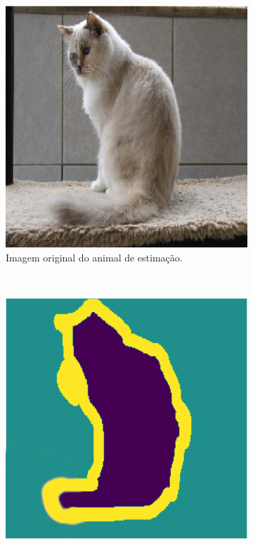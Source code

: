 \begin{figure}[H]
   \centering
   \caption[Amostra com máscara de características.]{Exemplo de amostra com máscara de características.}
   \label{project:fig:dataset:pets_1}
    \begin{subfigure}[t]{0.45\textwidth}
        \centering
        \includegraphics[width=1\linewidth]{recursos/imagens/project/pets_ori.png}
        \caption{Imagem original do animal de estimação.}
        \label{project:fig:dataset:pets_1.1}
    \end{subfigure}%
    ~ 
    \begin{subfigure}[t]{0.45\textwidth}
        \centering
        \includegraphics[width=1\linewidth]{recursos/imagens/project/pets_mask.png}

\end{subfigure}
\end{figure}
